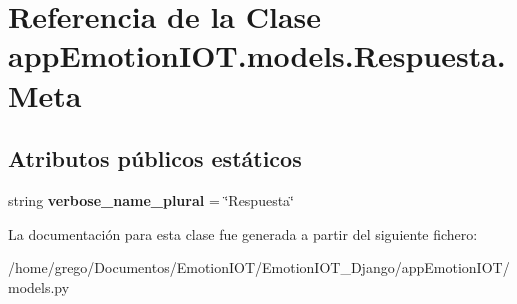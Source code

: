\hypertarget{classappEmotionIOT_1_1models_1_1Respuesta_1_1Meta}{}\section{Referencia de la Clase app\+Emotion\+I\+O\+T.\+models.\+Respuesta.\+Meta}
\label{classappEmotionIOT_1_1models_1_1Respuesta_1_1Meta}
\subsection*{Atributos públicos estáticos}
\begin{DoxyCompactItemize}
\item 
string {\bfseries verbose\+\_\+name\+\_\+plural} = \char`\"{}Respuesta\char`\"{}\hypertarget{classappEmotionIOT_1_1models_1_1Respuesta_1_1Meta_a053dbecd0aa05c28d3be7f618ee9e785}{}\label{classappEmotionIOT_1_1models_1_1Respuesta_1_1Meta_a053dbecd0aa05c28d3be7f618ee9e785}

\end{DoxyCompactItemize}


La documentación para esta clase fue generada a partir del siguiente fichero\+:\begin{DoxyCompactItemize}
\item 
/home/grego/\+Documentos/\+Emotion\+I\+O\+T/\+Emotion\+I\+O\+T\+\_\+\+Django/app\+Emotion\+I\+O\+T/models.\+py\end{DoxyCompactItemize}
